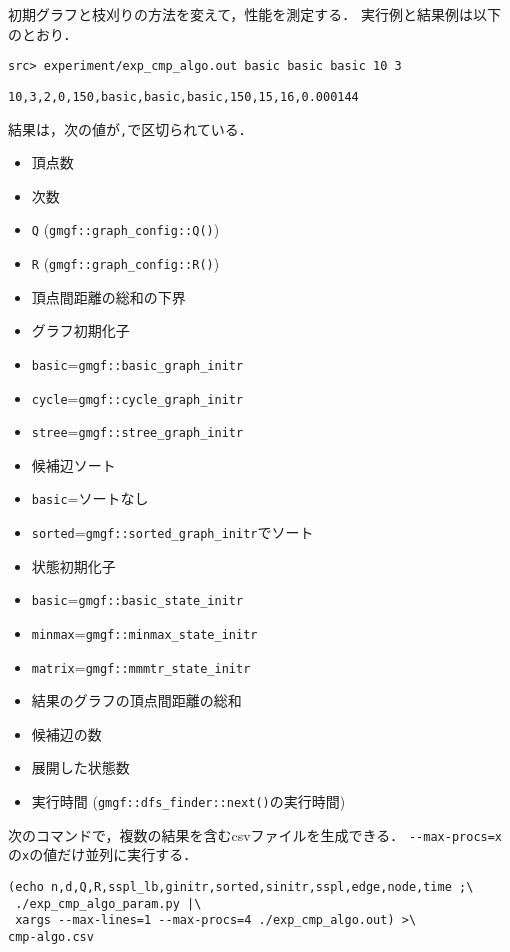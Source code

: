 初期グラフと枝刈りの方法を変えて，性能を測定する．
実行例と結果例は以下のとおり．

\begin{verbatim}
src> experiment/exp_cmp_algo.out basic basic basic 10 3
\end{verbatim}

\begin{verbatim}
10,3,2,0,150,basic,basic,basic,150,15,16,0.000144
\end{verbatim}

結果は，次の値が\texttt{,}で区切られている．

\begin{itemize}
\tightlist
\item
  頂点数
\item
  次数
\item
  \texttt{Q} (\texttt{gmgf::graph\_config::Q()})
\item
  \texttt{R} (\texttt{gmgf::graph\_config::R()})
\item
  頂点間距離の総和の下界
\item
  グラフ初期化子
\item
  \texttt{basic}=\texttt{gmgf::basic\_graph\_initr}
\item
  \texttt{cycle}=\texttt{gmgf::cycle\_graph\_initr}
\item
  \texttt{stree}=\texttt{gmgf::stree\_graph\_initr}
\item
  候補辺ソート
\item
  \texttt{basic}=ソートなし
\item
  \texttt{sorted}=\texttt{gmgf::sorted\_graph\_initr}でソート
\item
  状態初期化子
\item
  \texttt{basic}=\texttt{gmgf::basic\_state\_initr}
\item
  \texttt{minmax}=\texttt{gmgf::minmax\_state\_initr}
\item
  \texttt{matrix}=\texttt{gmgf::mmmtr\_state\_initr}
\item
  結果のグラフの頂点間距離の総和
\item
  候補辺の数
\item
  展開した状態数
\item
  実行時間 (\texttt{gmgf::dfs\_finder::next()}の実行時間)
\end{itemize}

次のコマンドで，複数の結果を含むcsvファイルを生成できる．
\texttt{-\/-max-procs=x}の\texttt{x}の値だけ並列に実行する．

\begin{verbatim}
(echo n,d,Q,R,sspl_lb,ginitr,sorted,sinitr,sspl,edge,node,time ;\
 ./exp_cmp_algo_param.py |\
 xargs --max-lines=1 --max-procs=4 ./exp_cmp_algo.out) >\
cmp-algo.csv
\end{verbatim}

